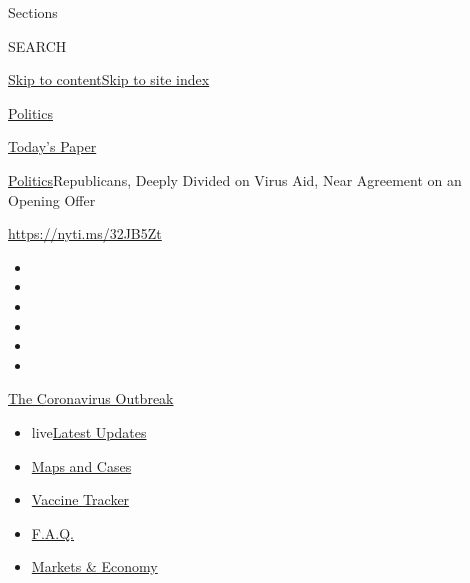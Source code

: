 Sections

SEARCH

\protect\hyperlink{site-content}{Skip to
content}\protect\hyperlink{site-index}{Skip to site index}

\href{https://www.nytimes.com/section/politics}{Politics}

\href{https://myaccount.nytimes.com/auth/login?response_type=cookie\&client_id=vi}{}

\href{https://www.nytimes.com/section/todayspaper}{Today's Paper}

\href{/section/politics}{Politics}\textbar{}Republicans, Deeply Divided
on Virus Aid, Near Agreement on an Opening Offer

\href{https://nyti.ms/32JB5Zt}{https://nyti.ms/32JB5Zt}

\begin{itemize}
\item
\item
\item
\item
\item
\item
\end{itemize}

\href{https://www.nytimes.com/news-event/coronavirus?action=click\&pgtype=Article\&state=default\&region=TOP_BANNER\&context=storylines_menu}{The
Coronavirus Outbreak}

\begin{itemize}
\tightlist
\item
  live\href{https://www.nytimes.com/2020/08/08/world/coronavirus-updates.html?action=click\&pgtype=Article\&state=default\&region=TOP_BANNER\&context=storylines_menu}{Latest
  Updates}
\item
  \href{https://www.nytimes.com/interactive/2020/us/coronavirus-us-cases.html?action=click\&pgtype=Article\&state=default\&region=TOP_BANNER\&context=storylines_menu}{Maps
  and Cases}
\item
  \href{https://www.nytimes.com/interactive/2020/science/coronavirus-vaccine-tracker.html?action=click\&pgtype=Article\&state=default\&region=TOP_BANNER\&context=storylines_menu}{Vaccine
  Tracker}
\item
  \href{https://www.nytimes.com/interactive/2020/world/coronavirus-tips-advice.html?action=click\&pgtype=Article\&state=default\&region=TOP_BANNER\&context=storylines_menu}{F.A.Q.}
\item
  \href{https://www.nytimes.com/live/2020/08/07/business/stock-market-today-coronavirus?action=click\&pgtype=Article\&state=default\&region=TOP_BANNER\&context=storylines_menu}{Markets
  \& Economy}
\end{itemize}

